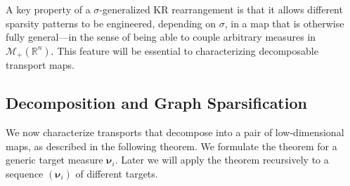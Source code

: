 \documentclass[twoside,11pt]{article}
\newcommand{\borelm}{\mathscr{M}}
\newcommand{\borelmp}{\borelm_+}
\newcommand{\genm}{\boldsymbol{\nu} }   %
\newcommand{\re}{\mathbb{R}}
\begin{document}
%
%
%
%
%
A key
%
property of a $\sigma$-generalized KR rearrangement
%
is that it allows different
sparsity patterns to be engineered, depending on $\sigma$, in
%
a map that is
otherwise fully general---in the sense of being able to couple
arbitrary 
measures in $\borelmp(\re^n)$.
%
%
%
This feature will be essential to characterizing decomposable transport maps.
%
%
%
%
%

%

\subsection{Decomposition and Graph Sparsification}
\label{sec:decompMainResults}
%
We now characterize transports that decompose into a pair of
low-dimensional maps, as described in the following theorem.
%
%
We formulate the theorem for a generic target measure
$\genm_i$.
%
%
Later we will apply the theorem recursively
to a sequence $(\genm_i)$ of different targets.


%
%

%
%
%

%
%
%
%
\end{document}
